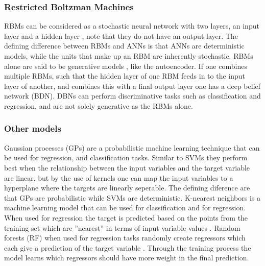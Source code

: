 \subsubsection*{Restricted Boltzman Machines}
RBMs can be considered as a stochastic neural network with two layers, an input layer and a hidden layer \cite{DBN_chicken_swarm_optim}, note that they do not have an output layer. 
The defining difference between RBMs and ANNs is that ANNs are deterministic models, while the units that make up an RBM are inherently stochastic. 
RBMs alone are said to be generative models \cite{rbm_wikipedia}, like the autoencoder. 
If one combines multiple RBMs, such that the hidden layer of one RBM feeds in to the input layer of another, and combines this with a final output layer one has a deep belief network (BDN). 
DBNs can perform discriminative tasks such as classification and regression, and are not solely generative as the RBMs alone.

\subsubsection*{Other models}
Gaussian processes (GPs) are a probabilistic machine learning technique that can be used for regression, and classification tasks. 
Similar to SVMs they perform best when the relationship between the input variables and the target variable are linear, but by the use of kernels one can map the input variables to a hyperplane where the targets are linearly seperable. \cite{GP_book}
The defining diference are that GPs are probabilistic while SVMs are deterministic. 
K-nearest neighbors is a machine learning model that can be used for classification and for regression. 
When used for regression the target is predicted based on the points from the training set which are ''nearest'' in terms of input variable values \cite{high_freq_scada_perf_monit_sensitivity}.
Random forests (RF) when used for regression tasks randomly create regressors which each give a prediction of the target variable \cite{high_freq_scada_perf_monit_sensitivity}. 
Through the training process the model learns which regressors should have more weight in the final prediction. 

